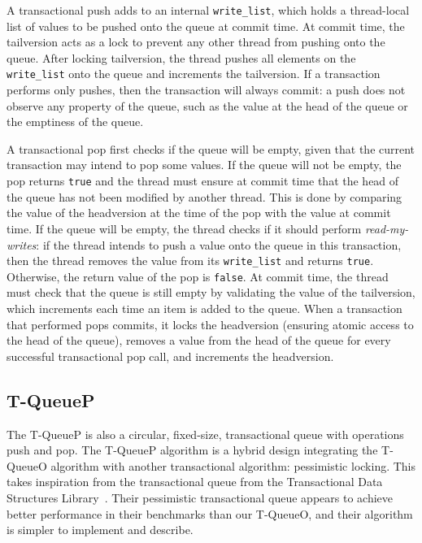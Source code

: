A transactional push adds to an internal \texttt{write\_list}, which holds a thread-local list of values to be pushed onto the queue at commit time. At commit time, the tailversion acts as a lock to prevent any other thread from pushing onto the queue. After locking tailversion, the thread pushes all elements on the \texttt{write\_list} onto the queue and increments the tailversion.
If a transaction performs only pushes, then the transaction will always commit: a push does not observe any property of the queue, such as the value at the head of the queue or the emptiness of the queue. 

A transactional pop first checks if the queue will be empty, given that the current transaction may intend to pop some values. If the queue will not be empty, the pop returns \texttt{true} and the thread must ensure at commit time that the head of the queue has not been modified by another thread. This is done by comparing the value of the headversion at the time of the pop with the value at commit time. 
If the queue will be empty, the thread checks if it should perform \emph{read-my-writes}: if the thread intends to push a value onto the queue in this transaction, then the thread removes the value from its \texttt{write\_list} and returns \texttt{true}. Otherwise, the return value of the pop is \texttt{false}. At commit time, the thread must check that the queue is still empty by validating the value of the tailversion, which increments each time an item is added to the queue.
When a transaction that performed pops commits, it locks the headversion (ensuring atomic access to the head of the queue), removes a value from the head of the queue for every successful transactional pop call, and increments the headversion.


\subsection{T-QueueP}
The T-QueueP is also a circular, fixed-size, transactional queue with operations push and pop. The T-QueueP algorithm is a hybrid design integrating the T-QueueO algorithm with another transactional algorithm: pessimistic locking. This takes inspiration from the transactional queue from the Transactional Data Structures Library~\cite{tdsl}. Their pessimistic transactional queue appears to achieve better performance in their benchmarks than our T-QueueO, and their algorithm is simpler to implement and describe. 

